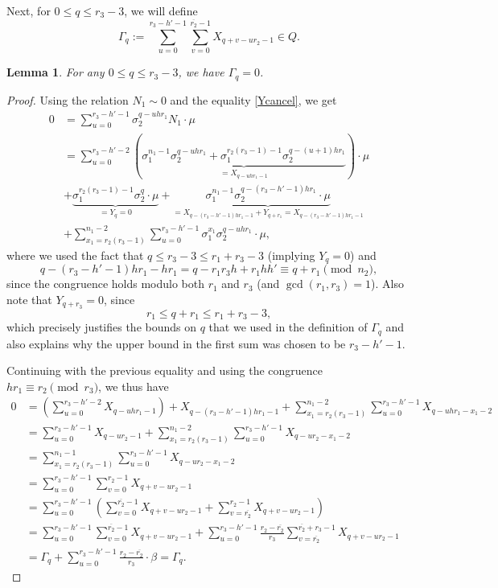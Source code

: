 \documentclass[12pt,a4paper]{article}
\newtheorem{lemma}[theorem]{Lemma}
\theoremstyle{definition}
\newcommand{\Z}{\mathbb{Z}}
\newcommand{\uo}{\overline{r_2}}
\begin{document}
Next, for $0\leq q \leq r_3-3$, we will define $$\Gamma_q:=\sum_{u=0}^{r_3-h'-1}\sum_{v=0}^{\uo-1}X_{q+v-ur_2-1}\in Q.$$

\begin{lemma}
For any $0\leq q \leq r_3-3$, we have $\Gamma_q=0$.
\end{lemma}
\begin{proof}
Using the relation $N_1\sim 0$ and the equality \eqref{Ycancel}, 
we get
\begin{align*}
0&= \sum_{u=0}^{r_3-h'-1} \sigma_2^{q-uhr_1}N_1\cdot \mu\\
&= \sum_{u=0}^{r_3-h'-2} \left( \underbrace{\sigma_1^{n_1-1}\sigma_2^{q-uh r_1} +\sigma_1^{r_2(r_3-1)-1}\sigma_2^{q-(u+1)h r_1}}_{=X_{q-uhr_1-1}} \right)\cdot \mu\\
&+\underbrace{\sigma_1^{r_2(r_3-1)-1}\sigma_2^q\cdot \mu}_{=Y_q=0}+
\underbrace{\sigma_1^{n_1-1}\sigma_2^{q-(r_3-h'-1)h r_1}\cdot\mu}_{=X_{q-(r_3-h'-1)hr_1-1}+Y_{q+r_1}=X_{q-(r_3-h'-1)hr_1-1}}\\
&+\sum_{x_1=r_2(r_3-1)}^{n_1-2}\sum_{u=0}^{r_3-h'-1} \sigma_1^{x_1}\sigma_2^{q-uh r_1}\cdot \mu,
\end{align*}
where we used the fact that $q\leq r_3-3\leq r_1+r_3-3$ (implying $Y_q=0$) and $$q-(r_3-h'-1)h r_1-hr_1=q-r_1r_3h+r_1hh'\equiv q+r_1\pmod{n_2},$$ since the congruence holds modulo both $r_1$ and $r_3$ (and $\gcd(r_1,r_3)=1$). Also note that $Y_{q+r_3}=0$, since
$$r_1\leq q+r_1\leq r_1+r_3-3,$$
which precisely justifies the bounds on $q$ that we used in the definition of $\Gamma_q$ and also explains why the upper bound in the first sum was chosen to be $r_3-h'-1$.

Continuing with the previous equality and using the congruence $hr_1\equiv r_2\pmod{r_3}$, we thus have
\begin{align*}
0&= \left(\sum_{u=0}^{r_3-h'-2} X_{q-uhr_1-1}\right)+X_{q-(r_3-h'-1)hr_1-1}+\sum_{x_1=r_2(r_3-1)}^{n_1-2}\sum_{u=0}^{r_3-h'-1} X_{q-uh r_1-x_1-2}\\
&=\sum_{u=0}^{r_3-h'-1} X_{q-ur_2-1}+\sum_{x_1=r_2(r_3-1)}^{n_1-2}\sum_{u=0}^{r_3-h'-1} X_{q-ur_2-x_1-2}\\
&=\sum_{x_1=r_2(r_3-1)}^{n_1-1}\sum_{u=0}^{r_3-h'-1} X_{q-ur_2-x_1-2}\\
&=\sum_{u=0}^{r_3-h'-1} \sum_{v=0}^{r_2-1} X_{q+v-ur_2-1}\\
&=\sum_{u=0}^{r_3-h'-1} \left(\sum_{v=0}^{\overline{r_2}-1} X_{q+v-ur_2-1}+\sum_{v=\overline{r_2}}^{r_2-1} X_{q+v-ur_2-1}\right)\\
&=\sum_{u=0}^{r_3-h'-1} \sum_{v=0}^{\overline{r_2}-1} X_{q+v-ur_2-1}+\sum_{u=0}^{r_3-h'-1}\frac{r_2-\overline{r_2}}{r_3}\sum_{v=\overline{r_2}}^{\overline{r_2}+r_3-1} X_{q+v-ur_2-1}\\
&=\Gamma_q+\sum_{u=0}^{r_3-h'-1}\frac{r_2-\overline{r_2}}{r_3}\cdot \beta=\Gamma_q.
\end{align*}
\end{proof}
\end{document}
